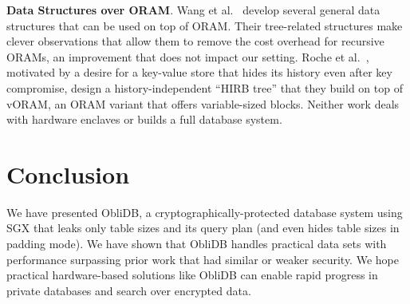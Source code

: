 \documentclass[letterpaper,twocolumn,10pt]{article}
\def\name/{ObliDB}
\begin{document}
  \noindent \textbf{Data Structures over ORAM}. Wang et al.~\cite{WNL+14} develop several general data structures that can be used on top of ORAM. Their tree-related structures make clever observations that allow them to remove the cost overhead for recursive ORAMs, an improvement that does not impact our setting. Roche et al.~\cite{RAC16}, motivated by a desire for a key-value store that hides its history even after key compromise, design a history-independent ``HIRB tree'' that they build on top of vORAM, an ORAM variant that offers variable-sized blocks. Neither work deals with hardware enclaves or builds a full database system. 

\section{Conclusion}\label{conclusion}
We have presented \name/, a cryptographically-protected database system using SGX that leaks only table sizes and its query plan (and even hides table sizes in padding mode). We have shown that \name/ handles practical data sets with performance surpassing prior work that had similar or weaker security. We hope practical hardware-based solutions like \name/ can enable rapid progress in private databases and search over encrypted data.


{\small 
}


\end{document}
